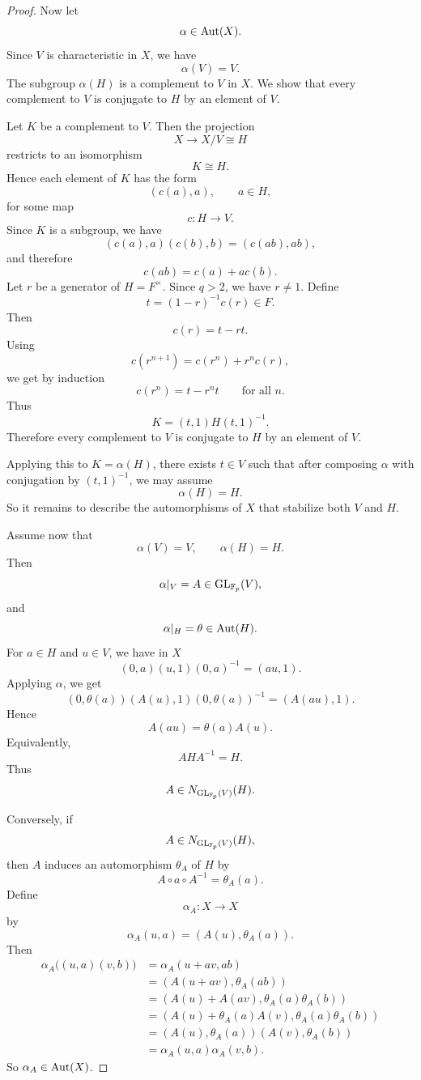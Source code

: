 \begin{proof}
    Now let
    \[
        \alpha\in \operatorname{Aut}(X).
    \]
    Since \(V\) is characteristic in \(X\), we have
    \[
        \alpha(V)=V.
    \]
    The subgroup \(\alpha(H)\) is a complement to \(V\) in \(X\). We show that every complement to \(V\) is conjugate to \(H\) by an element of \(V\).
    
    Let \(K\) be a complement to \(V\). Then the projection
    \[
        X\to X/V\cong H
    \]
    restricts to an isomorphism
    \[
        K\cong H.
    \]
    Hence each element of \(K\) has the form
    \[
        (c(a),a),
        \qquad
        a\in H,
    \]
    for some map
    \[
        c:H\to V.
    \]
    Since \(K\) is a subgroup, we have
    \[
        (c(a),a)(c(b),b)=(c(ab),ab),
    \]
    and therefore
    \[
        c(ab)=c(a)+a c(b).
    \]
    Let \(r\) be a generator of \(H=F^\times\). Since \(q>2\), we have \(r\neq 1\). Define
    \[
        t=(1-r)^{-1}c(r)\in F.
    \]
    Then
    \[
        c(r)=t-rt.
    \]
    Using
    \[
        c(r^{n+1})=c(r^n)+r^n c(r),
    \]
    we get by induction
    \[
        c(r^n)=t-r^n t
        \qquad
        \text{for all }n.
    \]
    Thus
    \[
        K=(t,1)H(t,1)^{-1}.
    \]
    Therefore every complement to \(V\) is conjugate to \(H\) by an element of \(V\).
    
    Applying this to \(K=\alpha(H)\), there exists \(t\in V\) such that after composing \(\alpha\) with conjugation by \((t,1)^{-1}\), we may assume
    \[
        \alpha(H)=H.
    \]
    So it remains to describe the automorphisms of \(X\) that stabilize both \(V\) and \(H\).
    
    Assume now that
    \[
        \alpha(V)=V,
        \qquad
        \alpha(H)=H.
    \]
    Then
    \[
        \alpha|_V=A\in \operatorname{GL}_{\mathbb{F}_p}(V),
    \]
    and
    \[
        \alpha|_H=\theta\in \operatorname{Aut}(H).
    \]
    For \(a\in H\) and \(u\in V\), we have in \(X\)
    \[
        (0,a)(u,1)(0,a)^{-1}=(au,1).
    \]
    Applying \(\alpha\), we get
    \[
        (0,\theta(a))(A(u),1)(0,\theta(a))^{-1}
        =
        (A(au),1).
    \]
    Hence
    \[
        A(au)=\theta(a)A(u).
    \]
    Equivalently,
    \[
        A H A^{-1}=H.
    \]
    Thus
    \[
        A\in N_{\operatorname{GL}_{\mathbb{F}_p}(V)}(H).
    \]
    
    Conversely, if
    \[
        A\in N_{\operatorname{GL}_{\mathbb{F}_p}(V)}(H),
    \]
    then \(A\) induces an automorphism \(\theta_A\) of \(H\) by
    \[
        A\circ a\circ A^{-1}=\theta_A(a).
    \]
    Define
    \[
        \alpha_A:X\to X
    \]
    by
    \[
        \alpha_A(u,a)=(A(u),\theta_A(a)).
    \]
    Then
    \[
    \begin{aligned}
        \alpha_A\bigl((u,a)(v,b)\bigr)
        &=\alpha_A(u+av,ab)  \\
        &=(A(u+av),\theta_A(ab)) \\
        &=(A(u)+A(av),\theta_A(a)\theta_A(b)) \\
        &=(A(u)+\theta_A(a)A(v),\theta_A(a)\theta_A(b)) \\
        &=(A(u),\theta_A(a))(A(v),\theta_A(b)) \\
        &=\alpha_A(u,a)\alpha_A(v,b).
    \end{aligned}
    \]
    So \(\alpha_A\in\operatorname{Aut}(X)\).
    

\end{proof}
